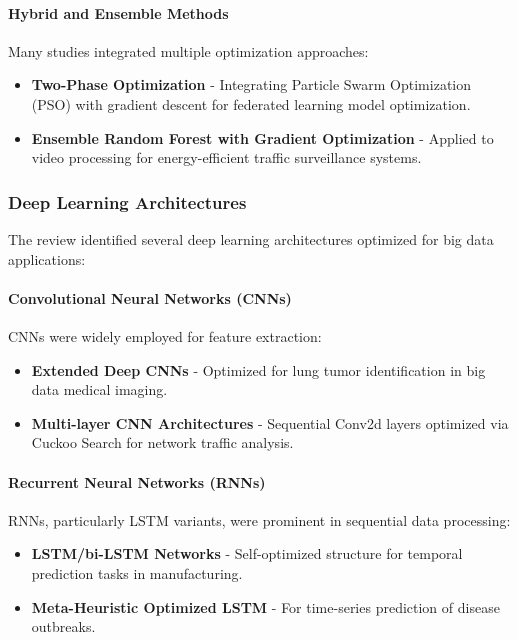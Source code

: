\paragraph{Hybrid and Ensemble Methods}
Many studies integrated multiple optimization approaches:
\begin{itemize}
    \item \textbf{Two-Phase Optimization} - Integrating Particle Swarm Optimization (PSO) with gradient descent for federated learning model optimization.
    
    \item \textbf{Ensemble Random Forest with Gradient Optimization} \citep{Rajagopal20247175} - Applied to video processing for energy-efficient traffic surveillance systems.
\end{itemize}

\subsubsection{Deep Learning Architectures}
The review identified several deep learning architectures optimized for big data applications:

\paragraph{Convolutional Neural Networks (CNNs)}
CNNs were widely employed for feature extraction:
\begin{itemize}
    \item \textbf{Extended Deep CNNs} \citep{Ananth2022918} - Optimized for lung tumor identification in big data medical imaging.
    
    \item \textbf{Multi-layer CNN Architectures} - Sequential Conv2d layers optimized via Cuckoo Search for network traffic analysis.
\end{itemize}

\paragraph{Recurrent Neural Networks (RNNs)}
RNNs, particularly LSTM variants, were prominent in sequential data processing:
\begin{itemize}
    \item \textbf{LSTM/bi-LSTM Networks} \citep{Thoppil2021} - Self-optimized structure for temporal prediction tasks in manufacturing.
    
    \item \textbf{Meta-Heuristic Optimized LSTM} \citep{Eid20223845} - For time-series prediction of disease outbreaks.
\end{itemize}

